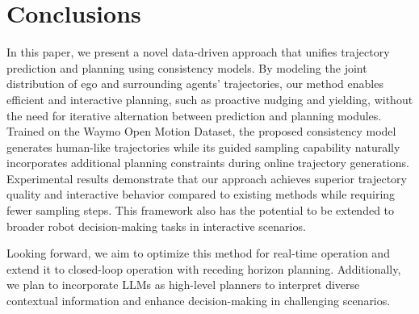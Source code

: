 \section{Conclusions}

In this paper, we present a novel data-driven approach that unifies trajectory prediction and planning using consistency models. 
By modeling the joint distribution of ego and surrounding agents' trajectories, our method enables efficient and interactive planning, such as proactive nudging and yielding, without the need for iterative alternation between prediction and planning modules. 
Trained on the Waymo Open Motion Dataset, the proposed consistency model generates human-like trajectories while its guided sampling capability naturally incorporates additional planning constraints during online trajectory generations.
Experimental results demonstrate that our approach achieves superior trajectory quality and interactive behavior compared to existing methods while requiring fewer sampling steps.
This framework also has the potential to be extended to broader robot decision-making tasks in interactive scenarios.

Looking forward, we aim to optimize this method for real-time operation and extend it to closed-loop operation with receding horizon planning.
Additionally, we plan to incorporate LLMs as high-level planners to interpret diverse contextual information and enhance decision-making in challenging scenarios.


